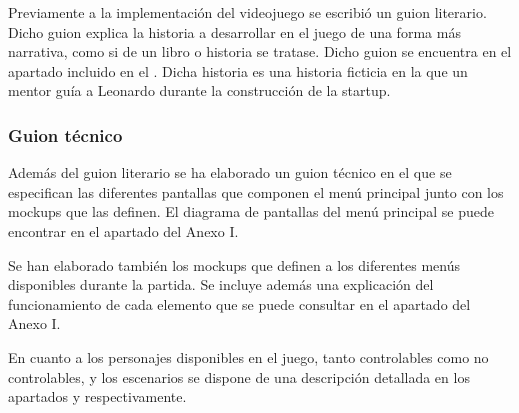 Previamente a la implementación del videojuego se escribió un guion literario. Dicho guion explica la historia a desarrollar en el juego de una forma más narrativa, como si de un libro o historia se tratase.
Dicho guion se encuentra en el apartado  incluido en el . Dicha historia es una historia ficticia en la que un mentor guía a Leonardo durante la construcción de la startup.

\subsubsection{Guion técnico}

Además del guion literario se ha elaborado un guion técnico en el que se especifican las diferentes pantallas que componen el menú principal junto con los mockups que las definen. El diagrama de pantallas del menú principal se puede encontrar en el apartado  del Anexo I.


Se han elaborado también los mockups que definen a los diferentes menús disponibles durante la partida. Se incluye además una explicación del funcionamiento de cada elemento que se puede consultar en el apartado  del Anexo I.


En cuanto a los personajes disponibles en el juego, tanto controlables como no controlables, y los escenarios se dispone de una descripción detallada en los apartados  y  respectivamente.